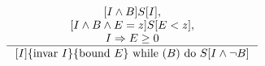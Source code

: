 $$
\inference{
[I \land B] S [I], \\
[I \land B \land E = z] S [E < z], \\
I \Rightarrow E \ge 0
}
{[I] \lbrace \textrm{invar }I\rbrace  \lbrace \textrm{bound }E \rbrace \textrm{ while }(B)\textrm{ do }S [I \land \lnot B]}
$$
